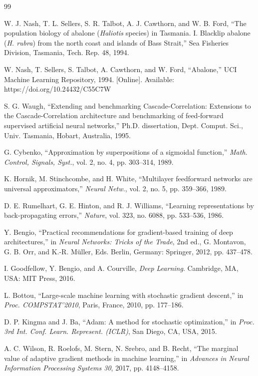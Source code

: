 \begin{thebibliography}{99}

W. J. Nash, T. L. Sellers, S. R. Talbot, A. J. Cawthorn, and W. B. Ford, ``The population biology of abalone (\emph{Haliotis} species) in Tasmania. I. Blacklip abalone (\emph{H. rubra}) from the north coast and islands of Bass Strait,'' Sea Fisheries Division, Tasmania, Tech. Rep. 48, 1994.

W. Nash, T. Sellers, S. Talbot, A. Cawthorn, and W. Ford, ``Abalone,'' UCI Machine Learning Repository, 1994. [Online]. Available: https://doi.org/10.24432/C55C7W

S. G. Waugh, ``Extending and benchmarking Cascade-Correlation: Extensions to the Cascade-Correlation architecture and benchmarking of feed-forward supervised artificial neural networks,'' Ph.D. dissertation, Dept. Comput. Sci., Univ. Tasmania, Hobart, Australia, 1995.

G. Cybenko, ``Approximation by superpositions of a sigmoidal function,'' \emph{Math. Control, Signals, Syst.}, vol. 2, no. 4, pp. 303--314, 1989.

K. Hornik, M. Stinchcombe, and H. White, ``Multilayer feedforward networks are universal approximators,'' \emph{Neural Netw.}, vol. 2, no. 5, pp. 359--366, 1989.

D. E. Rumelhart, G. E. Hinton, and R. J. Williams, ``Learning representations by back-propagating errors,'' \emph{Nature}, vol. 323, no. 6088, pp. 533--536, 1986.

Y. Bengio, ``Practical recommendations for gradient-based training of deep architectures,'' in \emph{Neural Networks: Tricks of the Trade}, 2nd ed., G. Montavon, G. B. Orr, and K.-R. M\"{u}ller, Eds. Berlin, Germany: Springer, 2012, pp. 437--478.

I. Goodfellow, Y. Bengio, and A. Courville, \emph{Deep Learning}. Cambridge, MA, USA: MIT Press, 2016.

L. Bottou, ``Large-scale machine learning with stochastic gradient descent,'' in \emph{Proc. COMPSTAT'2010}, Paris, France, 2010, pp. 177--186.

D. P. Kingma and J. Ba, ``Adam: A method for stochastic optimization,'' in \emph{Proc. 3rd Int. Conf. Learn. Represent. (ICLR)}, San Diego, CA, USA, 2015.

A. C. Wilson, R. Roelofs, M. Stern, N. Srebro, and B. Recht, ``The marginal value of adaptive gradient methods in machine learning,'' in \emph{Advances in Neural Information Processing Systems 30}, 2017, pp. 4148--4158.


\end{thebibliography}
